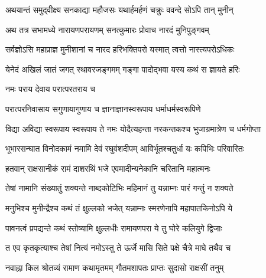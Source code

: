 \twolineshloka
{अथयान्तं समुद्‌वीक्ष्य सनकाद्या महौजसः}
{यथार्हमर्हणं चक्रुः ववन्दे सोऽपि तान् मुनीन्}%

 

\twolineshloka
{अथ तत्र सभामध्ये नारायणपरायणम्}
{सनत्कुमारः प्रोवाच नारदं मुनिपुङ्गवम्}%

 


\twolineshloka
{सर्वज्ञोऽसि महाप्राज्ञ मुनीशानां च नारद}
{हरिभक्तिपरो यस्मात् त्वत्तो नास्त्यपरोऽधिकः}%

 

\twolineshloka
{येनेदं अखिलं जातं जगत् स्थावरजङ्गमम्}
{गङ्गा पादोद्‌भवा यस्य कथं स ज्ञायते हरिः}%

 

\onelineshloka
{नमः पराय देवाय परात्परतराय च}%

 

\twolineshloka
{परात्परनिवासाय सगुणायागुणाय च}
{ज्ञानाज्ञानस्वरूपाय धर्माधर्मस्वरूपिणे}%

 

\twolineshloka
{विद्या अविद्या स्वरूपाय स्वरूपाय ते नमः}
{योदैत्यहन्ता नरकन्तकश्च भुजाग्रमात्रेण च धर्मगोप्ता}%

 

\twolineshloka
{भूभारसन्घात विनोदकामं नमामि देवं रघुवंशदीपम्}
{आविर्भूतश्चतुर्धा यः कपिभिः परिवारितः}%

 

\twolineshloka
{हतवान् राक्षसानीकं रामं दाशरथिं भजे}
{एवमादीन्यनेकानि चरितानि महात्मनः}%

 

\twolineshloka
{तेषां नामानि संख्यातुं शक्यन्ते नाब्दकोटिभिः}
{महिमानं तु यन्नाम्नः पारं गन्तुं न शक्यते}%

 

\twolineshloka
{मनुभिश्च मुनीन्द्रैश्च कथं तं क्षुल्लको भजेत्}
{यन्नाम्नः स्मरणेनापि महापातकिनोऽपि ये}%

 

\twolineshloka
{पावनत्वं प्रपद्यन्ते कथं स्तोष्यामि क्षुल्लधीः}
{रामायणपरा ये तु घोरे कलियुगे द्विजाः}%

 

\twolineshloka
{त एव कृतकृत्याश्च तेषां नित्यं नमोऽस्तु ते}
{ऊर्जे मासि सिते पक्षे चैत्रे माघे तथैव च}%

 

\twolineshloka
{नवाह्ना किल श्रोतव्यं रामाण कथामृतमम्}
{गौतमशापतः प्राप्तः सुदासो राक्षसीं तनुम्}%

